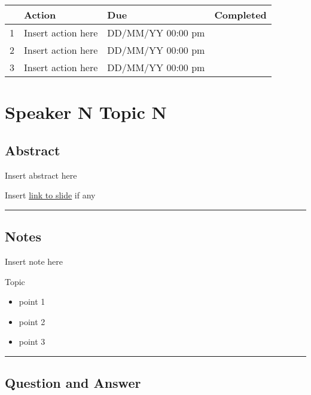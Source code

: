 \documentclass[
]{book}
\providecommand{\tightlist}{%
  \setlength{\itemsep}{0pt}\setlength{\parskip}{0pt}}
\begin{document}
\begin{longtable}[]{@{}llll@{}}
\toprule
& Action & Due & Completed \\
\midrule
\endhead
1 & Insert action here & DD/MM/YY 00:00 pm & \\
2 & Insert action here & DD/MM/YY 00:00 pm & \\
3 & Insert action here & DD/MM/YY 00:00 pm & \\
\bottomrule
\end{longtable}

\hypertarget{speaker-n-topic-n-4}{%
\chapter{Speaker N Topic N}\label{speaker-n-topic-n-4}}

\hypertarget{abstract-4}{%
\section*{Abstract}\label{abstract-4}}

Insert abstract here

Insert \href{}{link to slide} if any

\begin{center}\rule{0.5\linewidth}{0.5pt}\end{center}

\hypertarget{notes-4}{%
\section*{Notes}\label{notes-4}}

Insert note here

Topic

\begin{itemize}
\tightlist
\item
  point 1
\item
  point 2
\item
  point 3
\end{itemize}

\begin{center}\rule{0.5\linewidth}{0.5pt}\end{center}

\hypertarget{question-and-answer-4}{%
\section*{Question and Answer}\label{question-and-answer-4}}
\end{document}
